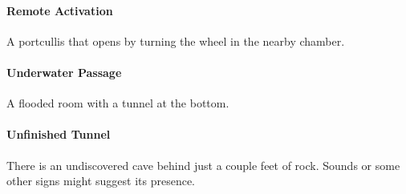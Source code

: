 \documentclass[itdr/core]{subfiles}
\begin{document}
\vfill
\paragraph{Remote Activation}
A portcullis that opens by turning the wheel in the nearby chamber.

\vfill
\paragraph{Underwater Passage}
A flooded room with a tunnel at the bottom.

\vfill
\paragraph{Unfinished Tunnel}
There is an undiscovered cave behind just a couple feet of rock. Sounds or some other signs might suggest its presence.

\vfill
\end{document}
